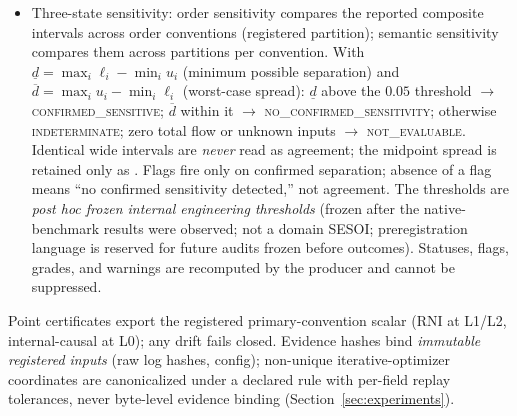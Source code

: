 \begin{sloppypar}
\begin{itemize}
covariance are not propagated. A  policy
and a per-interval  declare this design and the
potential roles of plug-in bias and omitted channel uncertainty, without
identifying their contributions. Artifact-level matched diagnostics additionally
contrast basic and percentile constructions and fixed versus joint channel
propagation on common replicates (Section~\ref{sec:experiments}); these are
descriptive sensitivity analyses, not the reported certificate semantics, not a
formal bias decomposition, and not a way to remove plug-in bias. Logical-envelope
anchor containment is a containment diagnostic, \emph{not} statistical coverage,
never combined with or compared against sampling coverage.  is the hull
of the reported convention composite intervals; interval certificates export
 and no scalar.
\item Three-state sensitivity: order sensitivity compares the reported
composite intervals across order conventions (registered partition);
semantic sensitivity compares them across partitions per convention. With
$\underline d=\max_i\ell_i-\min_i u_i$ (minimum possible separation) and
$\overline d=\max_i u_i-\min_i\ell_i$ (worst-case spread): $\underline d$
above the $0.05$ threshold $\to$ \textsc{confirmed\_sensitive}; $\overline d$
within it $\to$ \textsc{no\_confirmed\_sensitivity}; otherwise
\textsc{indeterminate}; zero total flow or unknown inputs $\to$
\textsc{not\_evaluable}. Identical wide intervals are \emph{never} read as
agreement; the midpoint spread is retained only as
. Flags fire only on confirmed separation;
absence of a flag means ``no confirmed sensitivity detected,'' not agreement.
The thresholds are \emph{post hoc frozen internal engineering thresholds}
(frozen after the native-benchmark results were observed; not a domain SESOI;
preregistration language is reserved for future audits frozen before
outcomes). Statuses, flags, grades, and warnings are recomputed by the
producer and cannot be suppressed.
\end{itemize}
\end{sloppypar}
Point certificates export the registered primary-convention scalar (RNI at
L1/L2, internal-causal at L0); any drift fails closed. Evidence hashes bind
\emph{immutable registered inputs} (raw log hashes, config); non-unique
iterative-optimizer coordinates are canonicalized under a declared rule with
per-field replay tolerances, never byte-level evidence binding
(Section~\ref{sec:experiments}).

